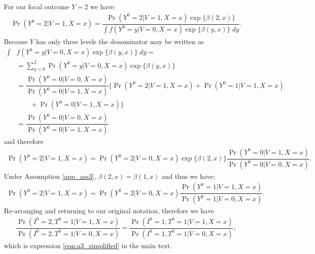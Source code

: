 \begin{appendix}
For our focal outcome $Y = 2$ we have:
\begin{align*}
    \Pr(Y^0 = 2 | V = 1, X = x) = \dfrac{\Pr(Y^0 = 2 | V = 1, X = x)\exp\{\beta(2, x)\}}{\int f(Y^0=y | V = 0, X = x)\exp\{\beta(y, x)\} \;dy}.
\end{align*}
Because $Y$ has only three levels the denominator may be written as
\begin{align*}
    \int & f(Y^0=y | V = 0, X = x) \exp\{\beta(y, x)\} \;dy =  \\
    &= \sum_{y=0}^2\Pr(Y^0=y| V = 0, X = x)\exp\{\beta(y, x)\} \\
    &= \dfrac{\Pr(Y^0=0| V = 0, X = x)}{\Pr(Y^0=0| V = 1, X = x)} \bigg\{\Pr(Y^0=2| V = 1, X = x) + \Pr(Y^0=1| V = 1, X = x) \\
    &\qquad   + \Pr(Y^0=0| V = 1, X = x) \bigg\} \\
    &= \dfrac{\Pr(Y^0=0| V = 0, X = x)}{\Pr(Y^0=0| V = 1, X = x)}
\end{align*}
and therefore 
\begin{align*}
    \Pr(Y^0 = 2 | V = 1, X = x) = \Pr(Y^0 = 2 | V = 0, X = x)\exp\{\beta(2, x)\}\dfrac{\Pr(Y^0=0| V = 1, X = x)}{\Pr(Y^0=0| V = 0, X = x)}.
\end{align*}
Under Assumption \ref{app_ass3}, $\beta(2, x) = \beta(1, x)$ and thus we have: 
\begin{align*}
    \Pr(Y^0 = 2 | V = 1, X = x) = \Pr(Y^0 = 2 | V = 0, X = x)\dfrac{\Pr(Y^0 = 1 | V = 1, X = x)}{\Pr(Y^0 = 1| V = 0, X = x)}.
\end{align*}
Re-arranging and returning to our original notation,  therefore we have 
\begin{align*}
    \dfrac{\Pr(I^0 = 2, T^0 = 1 | V = 1, X = x)}{\Pr(I^0 = 2, T^0 = 1 | V = 0, X = x)} = \dfrac{\Pr(I^0 = 1, T^0 = 1 | V = 1, X = x)}{\Pr(I^0 = 1, T^0 = 1 | V = 0, X = x)},
\end{align*}
which is expression \ref{eqn:a3_simplified} in the main text. 


\end{appendix}
